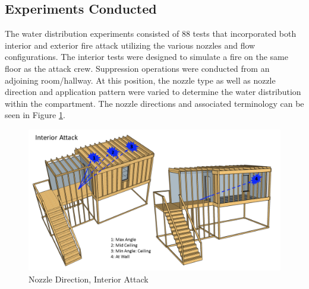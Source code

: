 \documentclass{article}
\begin{document}
\subsection{Experiments Conducted}

The water distribution experiments consisted of 88 tests that incorporated both interior and exterior fire attack utilizing the various nozzles and flow configurations. The interior tests were designed to simulate a fire on the same floor as the attack crew. Suppression operations were conducted from an adjoining room/hallway. At this position, the nozzle type as well as nozzle direction and application pattern were varied to determine the water distribution within the compartment. The nozzle directions and associated terminology can be seen in Figure \ref{fig:Nozzle_Direction_Interior_Attack}.

\begin{figure}[!ht]
	\centering
	\includegraphics[width=6in]{Figures/Water_Distribution/Nozzle_Position_Int}
	\caption{Nozzle Direction, Interior Attack}
	\label{fig:Nozzle_Direction_Interior_Attack}
\end{figure}

\clearpage
\end{document}
